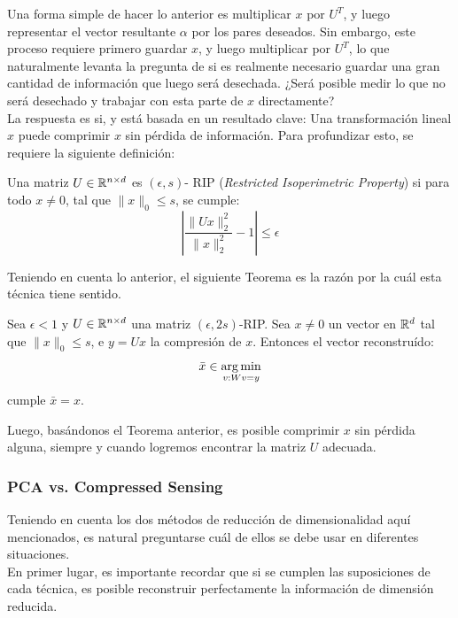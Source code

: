 Una forma simple de hacer lo anterior es multiplicar $x$ por $U^{T}$, y luego representar el vector resultante $\alpha $ por los pares deseados. Sin embargo, este proceso requiere primero guardar $x$, y luego multiplicar por $U^{T}$, lo que naturalmente levanta la pregunta de si es realmente necesario guardar una gran cantidad de información que luego será desechada. ¿Será posible medir lo que no será desechado y trabajar con esta parte de $x$ directamente?\\

La respuesta es si, y está basada en un resultado clave: Una transformación lineal $x$ puede comprimir $x$ sin pérdida de información. Para profundizar esto, se requiere la siguiente definición: 

\begin{definition}
Una matriz $U \in \mathbb{R}^{n \times d}$ es $(\epsilon,s)$- RIP (\textit{Restricted Isoperimetric Property}) si para todo $x \not =0$, tal que $\|x\|_0 \leq s$, se cumple: 
$$
\left |\dfrac{\| Ux\|^{2}_2}{\|x\|_2^{2}} - 1 \right | \leq \epsilon 
$$
\end{definition}

Teniendo en cuenta lo anterior, el siguiente Teorema es la razón por la cuál esta técnica tiene sentido.

\begin{theorem}
Sea $\epsilon <1$ y $U \in \mathbb{R}^{n \times d}$ una matriz $(\epsilon, 2s)$-RIP. Sea $x \not = 0$ un vector en $\mathbb{R}^d$ tal que $\| x \|_0 \leq s$, e $y = Ux$ la compresión de $x$. Entonces el vector reconstruído: 
$$
\bar{x} \in \underset{v: Wv = y}{\operatorname*{arg\,min}}
$$
cumple $\bar{x} = x$. 
\end{theorem}

Luego, basándonos el Teorema anterior, es posible comprimir $x$ sin pérdida alguna, siempre y cuando logremos encontrar la matriz $U$ adecuada. 


\subsubsection{PCA vs. Compressed Sensing}

Teniendo en cuenta los dos métodos de reducción de dimensionalidad aquí mencionados, es natural preguntarse cuál de ellos se debe usar en diferentes situaciones.  \\

En primer lugar, es importante recordar que si se cumplen las suposiciones de cada técnica, es posible reconstruir perfectamente la información de dimensión reducida. \\


